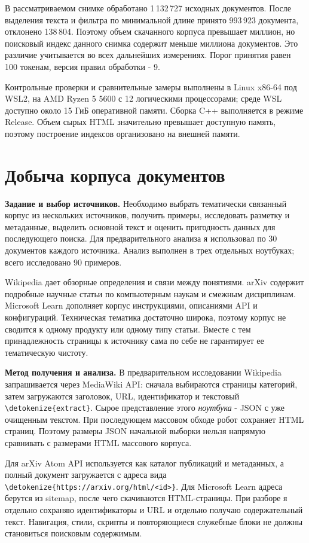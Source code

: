 \documentclass[pdf,unicode,12pt,a4paper,oneside,fleqn]{article}
\newcommand{\labsection}[2]{\par\Needspace{9\baselineskip}\setcounter{section}{\numexpr#1-1\relax}\section{#2}}
\newcommand{\partlabel}[1]{\par\Needspace{4\baselineskip}\medskip\textbf{#1.}\quad}
\DeclareRobustCommand{\code}[1]{\expandafter\nolinkurl\expandafter{\detokenize{#1}}}
\begin{document}
В рассматриваемом снимке обработано 1\,132\,727 исходных документов. После
выделения текста и фильтра по минимальной длине принято 993\,923 документа,
отклонено 138\,804. Поэтому объем скачанного корпуса превышает миллион,
но поисковый индекс данного снимка содержит меньше миллиона документов.
Это различие учитывается во всех дальнейших измерениях. Порог принятия равен
100 токенам, версия правил обработки - 9.

Контрольные проверки и сравнительные замеры выполнены в Linux x86-64
под WSL2, на AMD Ryzen 5 5600 с 12 логическими процессорами; среде WSL
доступно около 15 ГиБ оперативной памяти. Сборка C++ выполняется в режиме
Release. Объем сырых HTML значительно превышает доступную память,
поэтому построение индексов организовано на внешней памяти.

\labsection{1}{Добыча корпуса документов}

\partlabel{Задание и выбор источников}
Необходимо выбрать тематически связанный корпус из нескольких источников,
получить примеры, исследовать разметку и метаданные, выделить основной текст
и оценить пригодность данных для последующего поиска. Для предварительного
анализа я использовал по 30 документов каждого источника. Анализ выполнен
в трех отдельных ноутбуках; всего исследовано 90 примеров.

Wikipedia дает обзорные определения и связи между понятиями. arXiv содержит
подробные научные статьи по компьютерным наукам и смежным дисциплинам.
Microsoft Learn дополняет корпус инструкциями, описаниями API и конфигураций.
Техническая тематика достаточно широка, поэтому корпус не сводится к одному
продукту или одному типу статьи. Вместе с тем принадлежность страницы к
источнику сама по себе не гарантирует ее тематическую чистоту.

\partlabel{Метод получения и анализа}
В предварительном исследовании Wikipedia запрашивается через MediaWiki API:
сначала выбираются страницы категорий, затем загружаются заголовок, URL,
идентификатор и текстовый \code{extract}. Сырое представление этого
\emph{ноутбука} - JSON с уже очищенным текстом. При последующем массовом
обходе робот сохраняет HTML страниц. Поэтому размеры JSON начальной выборки
нельзя напрямую сравнивать с размерами HTML массового корпуса.

Для arXiv Atom API используется как каталог публикаций и метаданных, а полный
документ загружается с адреса вида \code{https://arxiv.org/html/<id>}. Для
Microsoft Learn адреса берутся из sitemap, после чего скачиваются HTML-страницы.
При разборе я отдельно сохраняю идентификаторы и URL и отдельно получаю
содержательный текст. Навигация, стили, скрипты и повторяющиеся служебные
блоки не должны становиться поисковым содержимым.
\end{document}
